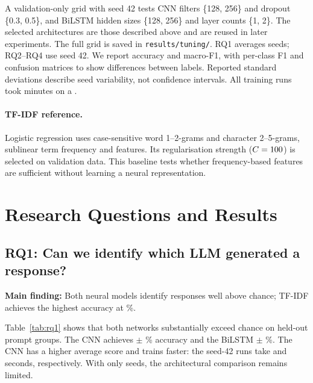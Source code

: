 \documentclass[11pt]{article}
\begin{document}
A validation-only grid with seed 42 tests CNN filters \{128, 256\} and dropout \{0.3, 0.5\}, and BiLSTM
hidden sizes \{128, 256\} and layer counts \{1, 2\}. The selected architectures are those described above
and are reused in later experiments. The full grid is saved in \texttt{results/tuning/}.
RQ1 averages \NumSeeds{} seeds; RQ2--RQ4 use seed 42. We report accuracy and macro-F1, with per-class F1
and confusion matrices to show differences between labels. Reported standard deviations describe
seed variability, not confidence intervals. All \TotalRuns{} training runs took \TotalTrainMinutes{}
minutes on a \Device{}.

\paragraph{TF-IDF reference.} Logistic regression uses case-sensitive word 1--2-grams and character
2--5-grams, sublinear term frequency and \BaselineFeatures{} features. Its regularisation strength
($C=100$) is selected on validation data. This baseline tests whether frequency-based features
are sufficient without learning a neural representation.

\section{Research Questions and Results}
\subsection{RQ1: Can we identify which LLM generated a response?}
\label{sec:rq1}
\noindent\textbf{Main finding:} Both neural models identify responses well above chance; TF-IDF achieves
 the highest accuracy at \BaselineAcc\%.

Table~\ref{tab:rq1} shows that both networks substantially exceed chance on held-out prompt groups.
The CNN achieves \RqOneCnnAcc{} $\pm$ \RqOneCnnAccStd\% accuracy and the BiLSTM
\RqOneLstmAcc{} $\pm$ \RqOneLstmAccStd\%. The CNN has a higher average score and trains faster:
the seed-42 runs take \CnnTrainSeconds{} and \LstmTrainSeconds{} seconds, respectively.
With only \NumSeeds{} seeds, the architectural comparison remains limited.

\begin{table}[!htb]
\centering\small
\caption{RQ1 on \TestRows{} test responses. Neural results are mean $\pm$ standard deviation over
\NumSeeds{} seeds. The final six columns are per-class F1 (\%).}
\label{tab:rq1}

\end{table}
\end{document}
